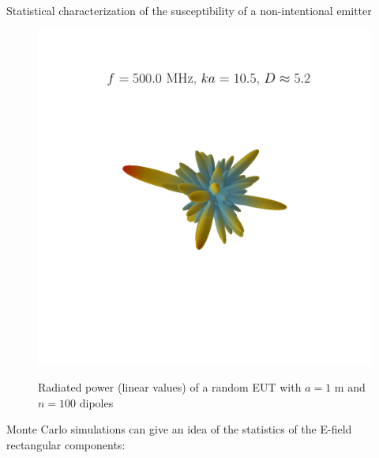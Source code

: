 \documentclass[final,hyperref={pdfpagelabels=false}]{beamer}
\begin{document}
\begin{frame}{}
\begin{columns}[t]
\begin{column}{0.32\linewidth}
\begin{block}{{Statistical characterization of the susceptibility of a non-intentional emitter}}
\begin{figure}
{          \includegraphics[trim=110 180 90 120,clip,width=0.45\columnwidth]{./img/rp_124.png}} 
\vspace{-0.3cm}
    \large{\caption{Radiated power (linear values) of a random EUT with  $a=1$ m and $n=100$ dipoles}}
     \label{fig_diagsr}
\end{figure}
Monte Carlo simulations can give an idea of the statistics of the E-field rectangular components:
\begin{figure}
     \centering
    \subfigure[$ka=2$, $n=4$]{
          \label{fig_2G}
}
\end{figure}
\end{block}
\end{column}
\end{columns}
\end{frame}
\end{document}
